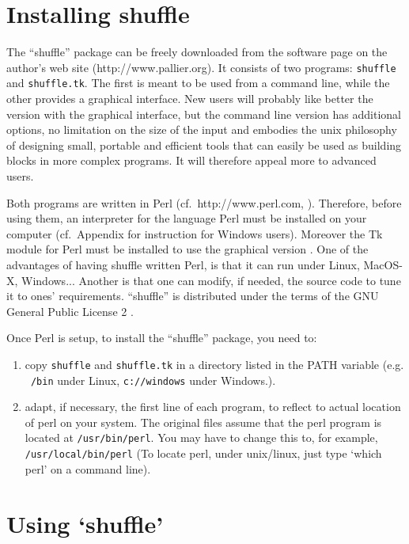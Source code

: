 \documentclass[doc]{apa}
\newcommand{\href}[2]{#2}
\begin{document}
\section*{Installing shuffle}

The ``shuffle'' package can be freely downloaded from the software page on the
author's web site (\href{http://www.pallier.org}{http://www.pallier.org}). It
consists of two programs: \texttt{shuffle} and \texttt{shuffle.tk}. The first
is meant to be used from a command line, while the other provides a graphical
interface. New users will probably like better the version with the graphical
interface, but the command line version has additional options, no limitation
on the size of the input and embodies the unix philosophy of designing small,
portable and efficient tools that can easily be used as building blocks in
more complex programs. It will therefore appeal more to advanced users.


Both programs are written in Perl
(cf.~\href{http://www.perl.com}{http://www.perl.com}, \cite{randal01}).
Therefore, before using them, an interpreter for the language Perl must be
installed on your computer (cf.~Appendix for instruction for Windows users).
Moreover the Tk module for Perl must be installed to use the graphical version
\cite{walsh99}.  One of the advantages of having shuffle written Perl, is that
it can run under Linux, MacOS-X, Windows...  Another is that one can modify,
if needed, the source code to tune it to ones' requirements.  ``shuffle'' is
distributed under the terms of the GNU General Public License 2 \cite{GPL}.

Once Perl is setup, to install the ``shuffle'' package, you need to:
\begin{enumerate} 
\item copy \texttt{shuffle} and \texttt{shuffle.tk} in a directory listed in
  the PATH variable (e.g.  \texttt{~/bin} under Linux, \texttt{c://windows}
    under Windows.).
  \item adapt, if necessary, the first line of each program, to reflect to
    actual location of perl on your system. The original files assume that the
    perl program is located at \texttt{/usr/bin/perl}. You may have to change
    this to, for example, \texttt{/usr/local/bin/perl} (To locate perl, under
    unix/linux, just type `which perl' on a command line).
\end{enumerate}

\section*{Using `shuffle'}
\end{document}
